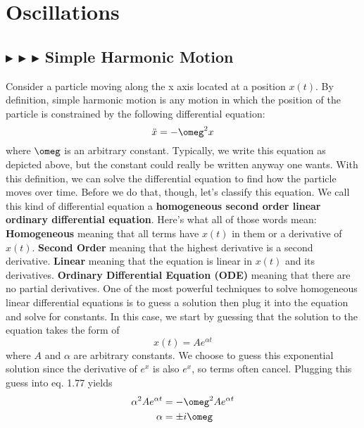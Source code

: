 \section{Oscillations}

%
%
\subsection{\color{PineGreen} $\blacktriangleright$ \color{Goldenrod} $\blacktriangleright$ \color{Orchid} $\blacktriangleright$ \color{black} Simple Harmonic Motion} \label{1.6.1}
Consider a particle moving along the x axis located at a position $x(t)$. By definition, simple harmonic motion is any motion in which the position of the particle is constrained by the following differential equation:
\begin{equation}
    \ddot{x} = -\omeg^2 x
\end{equation}
\noindent where $\omeg$ is an arbitrary constant. Typically, we write this equation as depicted above, but the constant could really be written anyway one wants. With this definition, we can solve the differential equation to find how the particle moves over time. Before we do that, though, let's classify this equation. We call this kind of differential equation a \textbf{homogeneous second order linear ordinary differential equation}. Here's what all of those words mean: \textbf{Homogeneous} meaning that all terms have $x(t)$ in them or a derivative of $x(t)$. \textbf{Second Order} meaning that the highest derivative is a second derivative. \textbf{Linear} meaning that the equation is linear in $x(t)$ and its derivatives. \textbf{Ordinary Differential Equation (ODE)} meaning that there are no partial derivatives. One of the most powerful techniques to solve homogeneous linear differential equations is to guess a solution then plug it into the equation and solve for constants. In this case, we start by guessing that the solution to the equation takes the form of 
\begin{equation*}
    x(t) = Ae^{\alpha t}
\end{equation*}
\noindent where $A$ and $\alpha$ are arbitrary constants. We choose to guess this exponential solution since the derivative of $e^x$ is also $e^x$, so terms often cancel. Plugging this guess into eq. 1.77 yields 
\begin{align*}
    \alpha^2Ae^{\alpha t} &= -\omeg^2 Ae^{\alpha t} \\
    \alpha &= \pm i\omeg
\end{align*}
